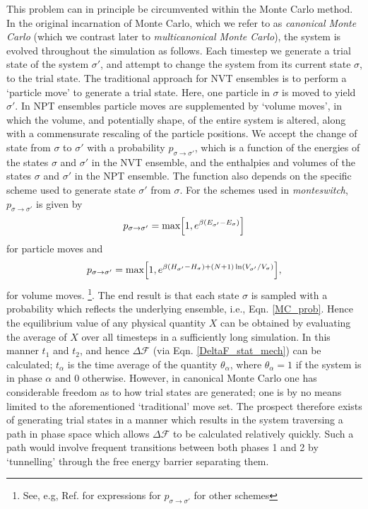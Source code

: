 \documentclass{report}
\begin{document}
This problem can in principle be circumvented within the Monte Carlo method.
In the original incarnation of Monte Carlo, which we refer to as \emph{canonical Monte Carlo}\cite{Metropolis_1953} (which we contrast later to 
\emph{multicanonical Monte Carlo}), the system is evolved throughout the simulation as follows. Each timestep we generate a trial state of the system 
$\sigma'$, and attempt to change the system from its current state $\sigma$, to the trial state. 
The traditional approach for NVT ensembles is to perform a `particle move' to generate a trial state. Here, one particle in $\sigma$ is moved
to yield $\sigma'$. In NPT ensembles particle moves are supplemented by `volume moves', in which the volume, and potentially shape, of the 
entire system is altered, along with a commensurate rescaling of the particle positions. We accept the change of state from $\sigma$ to $\sigma'$ with 
a probability $p_{\sigma\to\sigma'}$, which is a function of the energies of the states $\sigma$ and $\sigma'$ in the NVT ensemble, and
the enthalpies and volumes of the states $\sigma$ and $\sigma'$ in the NPT ensemble. The function also depends on the specific scheme used to generate 
state $\sigma'$ from $\sigma$. For the schemes used in \emph{monteswitch}, $p_{\sigma\to\sigma'}$ is given by
\begin{equation}\label{p_Metropolis}
p_{\sigma\to\sigma'}=\text{max}\Bigl[1,e^{\beta(E_{\sigma'}-E_{\sigma})}\Bigr]
\end{equation}
for particle moves and
\begin{equation}\label{p_Metropolis_NPT}
p_{\sigma\to\sigma'}=\text{max}\Bigl[1,e^{\beta(H_{\sigma'}-H_{\sigma})+(N+1)\ln(V_{\sigma'}/V_{\sigma})}\Bigr],
\end{equation}
for volume moves.
\footnote{See, e.g, Ref. \cite{book:Frenkel} for expressions for $p_{\sigma\to\sigma'}$ for other schemes}. 
The end result is that each state $\sigma$ is sampled with a probability which reflects the underlying ensemble, i.e., Eqn. \eqref{MC_prob}.
Hence the equilibrium value of any physical quantity $X$ can be obtained by evaluating the average of $X$ over all timesteps in a sufficiently long 
simulation. In this manner $t_1$ and $t_2$, and hence $\Delta \mathcal{F}$ (via Eqn. \eqref{DeltaF_stat_mech}) can be calculated; 
$t_{\alpha}$ is the time average of the quantity $\theta_{\alpha}$, where $\theta_{\alpha}=1$ if the system is in phase $\alpha$ and 0 otherwise.
However, in canonical Monte Carlo one has considerable freedom as to how trial states are generated; one is by no means limited to the aforementioned 
`traditional' move set. The prospect therefore exists of generating trial states in a manner which results in the system traversing a path in phase 
space which allows $\Delta \mathcal{F}$ to be calculated relatively quickly. Such a path would involve frequent transitions between both phases 1 and 
2 by `tunnelling' through the free energy barrier separating them.
\end{document}

